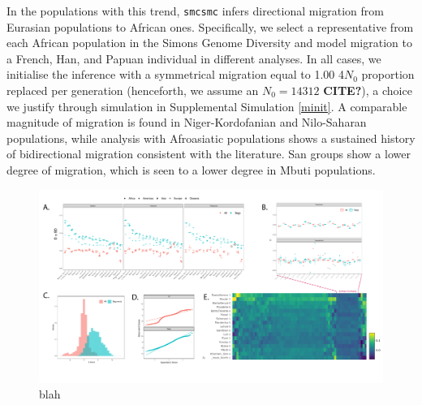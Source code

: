 \documentclass{article}
\begin{document}
In the populations with this trend, {\tt smcsmc} infers directional migration from Eurasian populations to African ones. Specifically, we select a representative from each African population in the Simons Genome Diversity and model migration to a French, Han, and Papuan individual in different analyses. In all cases, we initialise the inference with a symmetrical migration equal to 1.00 4$N_0$ proportion replaced per generation (henceforth, we assume an $N_0=14312$ {\bf CITE?}), a choice we justify through simulation in Supplemental Simulation \ref{minit}. A comparable magnitude of migration is found in Niger-Kordofanian and Nilo-Saharan populations, while analysis with Afroasiatic populations shows a sustained history of bidirectional migration consistent with the literature. San groups show a lower degree of migration, which is seen to a lower degree in Mbuti populations. 



\begin{figure}
	\centering
	\includegraphics[width=\textwidth]{../plot/dstats.pdf}
	\caption{blah}
\end{figure}
\newpage
\end{document}
